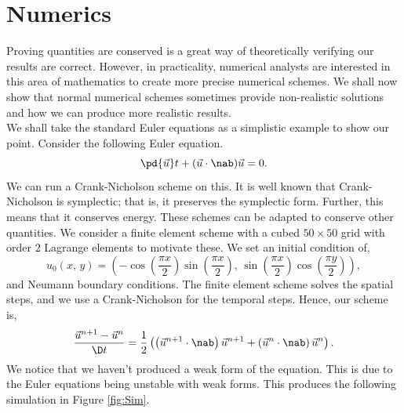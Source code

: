 
\section{Numerics}
\label{sec:nums}

Proving quantities are conserved is a great way of theoretically verifying our results are correct. However, in practicality, numerical analysts are interested in this area of mathematics to create more precise numerical schemes. We shall now show that normal numerical schemes sometimes provide non-realistic solutions and how we can produce more realistic results.\\

\noindent
We shall take the standard Euler equations as a simplistic example to show our point. Consider the following Euler equation.
$$ \pd {\vec u} t + ({\vec u} \cdot\nab){\vec u} = 0. $$
We can run a Crank-Nicholson scheme on this. It is well known that Crank-Nicholson is symplectic; that is, it preserves the symplectic form. Further, this means that it conserves energy. These schemes can be adapted to conserve other quantities. We consider a finite element scheme with a cubed $50\times 50$ grid with order $2$ Lagrange elements to motivate these. We set an initial condition of,
$$ u_0(x,\, y) = \left( -\cos \left( \frac{\pi x}{2} \right)\sin \left( \frac{\pi x}{2} \right),\, \sin\left( \frac{\pi x}{2} \right)\cos \left( \frac{\pi y}{2} \right) \right), $$
and Neumann boundary conditions. The finite element scheme solves the spatial steps, and we use a Crank-Nicholson for the temporal steps. Hence, our scheme is,
$$ \frac{{\vec u}^{n+1} - {\vec u}^n}{\D t} = \frac{1}{2}\left( \left({\vec u}^{n+1} \cdot \nab\right){\vec u}^{n+1} + \left({\vec u}^{n} \cdot \nab\right){\vec u}^{n}\right). $$
We notice that we haven't produced a weak form of the equation. This is due to the Euler equations being unstable with weak forms.
This produces the following simulation in Figure \ref{fig:Sim}.


